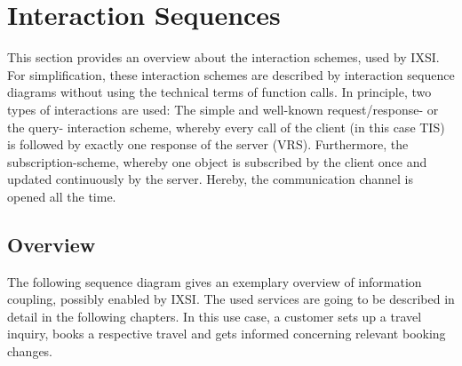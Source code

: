 \chapter{Interaction Sequences}
\label{cha:Interaktionsprotokolle}
This section provides an overview about the interaction schemes, used by IXSI. For simplification, these interaction schemes are described by interaction sequence diagrams without using the technical terms of function calls. In principle, two types of interactions are used: The simple and well-known request/response- or the query- interaction scheme, whereby every call of the client (in this case TIS) is followed by exactly one response of the server (VRS). Furthermore, the subscription-scheme, whereby one object is subscribed by the client once and updated continuously by the server. Hereby, the communication channel is opened all the time. 

\section{Overview}
The following sequence diagram gives an exemplary overview of information coupling, possibly enabled by IXSI. The used services are going to be described in detail in the following chapters. In this use case, a customer sets up a travel inquiry, books a respective travel and gets informed concerning relevant booking changes. 

